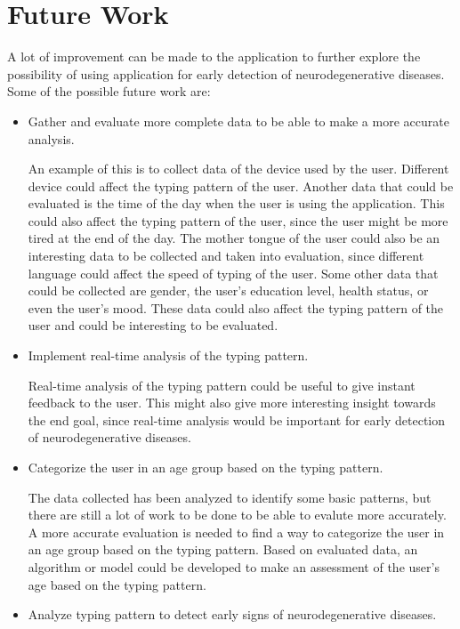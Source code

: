 \section{Future Work}


A lot of improvement can be made to the application to further explore the possibility of using application for early detection of neurodegenerative diseases.
Some of the possible future work are:
\begin{itemize}
    \item Gather and evaluate more complete data to be able to make a more accurate analysis.
    
    An example of this is to collect data of the device used by the user.
    Different device could affect the typing pattern of the user.
    Another data that could be evaluated is the time of the day when the user is using the application.
    This could also affect the typing pattern of the user, since the user might be more tired at the end of the day.
    The mother tongue of the user could also be an interesting data to be collected and taken into evaluation, since different language could affect the speed of typing of the user.
    Some other data that could be collected are gender, the user's education level, health status, or even the user's mood.
    These data could also affect the typing pattern of the user and could be interesting to be evaluated.

    \item Implement real-time analysis of the typing pattern.
    
    Real-time analysis of the typing pattern could be useful to give instant feedback to the user.
    This might also give more interesting insight towards the end goal, since real-time analysis would be important for early detection of neurodegenerative diseases.

    \item Categorize the user in an age group based on the typing pattern.
    
    The data collected has been analyzed to identify some basic patterns, but there are still a lot of work to be done to be able to evalute more accurately.
    A more accurate evaluation is needed to find a way to categorize the user in an age group based on the typing pattern.
    Based on evaluated data, an algorithm or model could be developed to make an assessment of the user's age based on the typing pattern. 

    \item Analyze typing pattern to detect early signs of neurodegenerative diseases.

\end{itemize}

